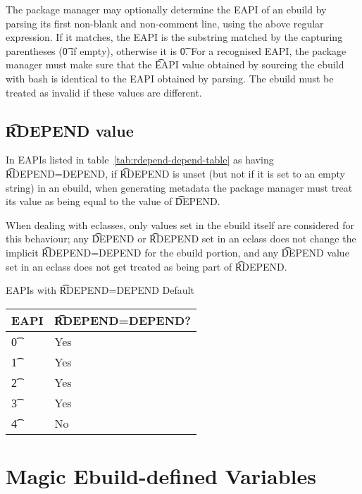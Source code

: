 The package manager may optionally determine the EAPI of an ebuild by parsing its first non-blank
and non-comment line, using the above regular expression. If it matches, the EAPI is the substring
matched by the capturing parentheses (\t{0} if empty), otherwise it is \t{0}. For a recognised
EAPI, the package manager must make sure that the \t{EAPI} value obtained by sourcing the ebuild
with bash is identical to the EAPI obtained by parsing. The ebuild must be treated as invalid if
these values are different.

\subsection{\t{RDEPEND} value}
\label{sec:rdepend-depend}

 In EAPIs listed in table~\ref{tab:rdepend-depend-table} as having
\t{RDEPEND=DEPEND}, if \t{RDEPEND} is unset (but not if it is set to an empty string) in an ebuild,
when generating metadata the package manager must treat its value as being equal to the value of
\t{DEPEND}.

When dealing with eclasses, only values set in the ebuild itself are considered for this behaviour;
any \t{DEPEND} or \t{RDEPEND} set in an eclass does not change the implicit \t{RDEPEND=DEPEND} for
the ebuild portion, and any \t{DEPEND} value set in an eclass does not get treated as being part of
\t{RDEPEND}.

\begin{centertable}{EAPIs with \t{RDEPEND=DEPEND} Default} \label{tab:rdepend-depend-table}
    \begin{tabular}{ l l }
        \toprule
        \multicolumn{1}{c}{\textbf{EAPI}} &
        \multicolumn{1}{c}{\textbf{\t{RDEPEND=DEPEND}?}} \\
        \midrule
    \t{0} & Yes \\
    \t{1} & Yes \\
    \t{2} & Yes \\
    \t{3} & Yes \\
    \t{4} & No \\
    \bottomrule
    \end{tabular}
\end{centertable}

\section{Magic Ebuild-defined Variables}

